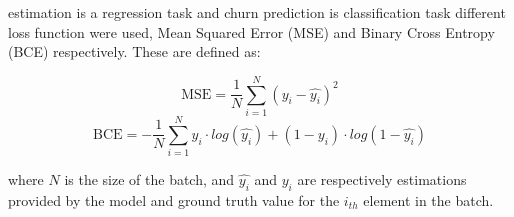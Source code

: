 estimation is a regression task and churn prediction is classification task different loss function were used, Mean Squared Error (MSE) and Binary Cross Entropy (BCE) respectively. These are defined as:

\begin{equation}
\label{mae}
    \text{MSE}=
        \dfrac
            {1}
            {N}
            \sum\limits_{i=1}^{N}  (y_i - \hat{y_i})^2
\end{equation}
\begin{equation}
\label{bce}
    \text{BCE}=
        -\dfrac
            {1}
            {N}
        \sum\limits_{i=1}^{N}  y_i \cdot log(\hat{y_i}) + (1-y_i) \cdot log(1 - \hat{y_i})
\end{equation}

where $N$ is the size of the batch, and $\hat{y_i}$ and $y_i$ are respectively estimations provided by the model and ground truth value for the $i_{th}$ element in the batch. 

